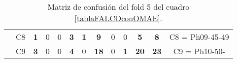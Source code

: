\begin{table}[H]
{\begin{tabular}{|ccrrrrrrrrrrc|}
\multicolumn{1}{|c|}{}                                      & \multicolumn{1}{c|}{C8} & \multicolumn{1}{c|}{\textbf{1}} & \multicolumn{1}{c|}{0}          & \multicolumn{1}{c|}{0}          & \multicolumn{1}{c|}{\textbf{3}} & \multicolumn{1}{c|}{\textbf{1}} & \multicolumn{1}{c|}{\textbf{9}}  & \multicolumn{1}{c|}{0}  & \multicolumn{1}{c|}{0}          & \multicolumn{1}{c|}{\textbf{5}}  & \multicolumn{1}{c|}{\textbf{8}}  & C8 = Ph09-45-49   \\ \cline{2-13}
\multicolumn{1}{|c|}{}                                      & \multicolumn{1}{c|}{C9} & \multicolumn{1}{c|}{\textbf{3}} & \multicolumn{1}{c|}{0}          & \multicolumn{1}{c|}{0}          & \multicolumn{1}{c|}{\textbf{4}} & \multicolumn{1}{c|}{0}          & \multicolumn{1}{c|}{\textbf{18}} & \multicolumn{1}{c|}{0}  & \multicolumn{1}{c|}{\textbf{1}} & \multicolumn{1}{c|}{\textbf{20}} & \multicolumn{1}{c|}{\textbf{23}} & C9 = Ph10-50-     \\ \hline
\end{tabular}%
}
\caption{Matriz de confusión del fold 5 del cuadro \ref{tablaFALCOconOMAE}.}
\end{table}


